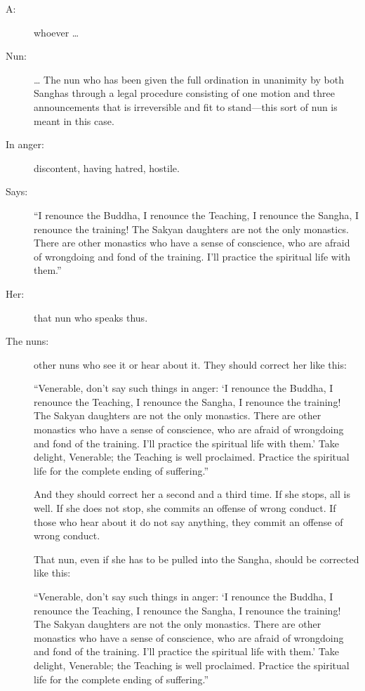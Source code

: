 \documentclass[12pt,openany]{book}%
\begin{document}
\begin{description}%
\item[A: ] whoever … %
\item[Nun: ] … The nun who has been given the full ordination in unanimity by both Sanghas through a legal procedure consisting of one motion and three announcements that is irreversible and fit to stand—this sort of nun is meant in this case. %
\item[In anger: ] discontent, having hatred, hostile. %
\item[Says: ] “I renounce the Buddha, I renounce the Teaching, I renounce the Sangha, I renounce the training! The Sakyan daughters are not the only monastics. There are other monastics who have a sense of conscience, who are afraid of wrongdoing and fond of the training. I’ll practice the spiritual life with them.” %
\item[Her: ] that nun who speaks thus. %
\item[The nuns: ] other nuns who see it or hear about it. They should correct her like this: 

“Venerable, don’t say such things in anger: ‘I renounce the Buddha, I renounce the Teaching, I renounce the Sangha, I renounce the training! The Sakyan daughters are not the only monastics. There are other monastics who have a sense of conscience, who are afraid of wrongdoing and fond of the training. I’ll practice the spiritual life with them.’ Take delight, Venerable; the Teaching is well proclaimed. Practice the spiritual life for the complete ending of suffering.” 

And they should correct her a second and a third time. If she stops, all is well.  If she does not stop, she commits an offense of wrong conduct.  If those who hear about it do not say anything, they commit an offense of wrong conduct. 

That nun, even if she has to be pulled into the Sangha, should be corrected like this: 

“Venerable, don’t say such things in anger: ‘I renounce the Buddha, I renounce the Teaching, I renounce the Sangha, I renounce the training! The Sakyan daughters are not the only monastics. There are other monastics who have a sense of conscience, who are afraid of wrongdoing and fond of the training. I’ll practice the spiritual life with them.’ Take delight, Venerable; the Teaching is well proclaimed. Practice the spiritual life for the complete ending of suffering.” 


\end{description}
\end{document}
